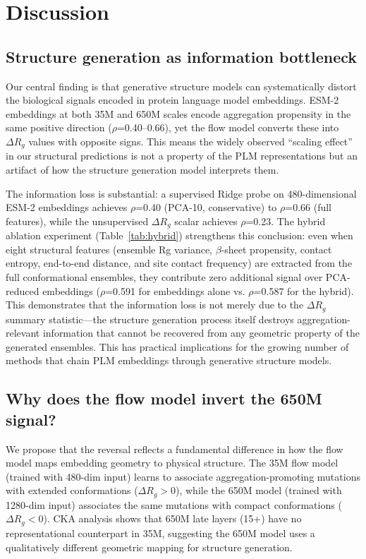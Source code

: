 \documentclass[10pt,letterpaper]{article}
\begin{document}
\section*{Discussion}

\subsection*{Structure generation as information bottleneck}

Our central finding is that generative structure models can systematically distort the biological signals encoded in protein language model embeddings. ESM-2 embeddings at both 35M and 650M scales encode aggregation propensity in the same positive direction ($\rho$=0.40--0.66), yet the flow model converts these into $\Delta R_g$ values with opposite signs. This means the widely observed ``scaling effect'' in our structural predictions is not a property of the PLM representations but an artifact of how the structure generation model interprets them.

The information loss is substantial: a supervised Ridge probe on 480-dimensional ESM-2 embeddings achieves $\rho$=0.40 (PCA-10, conservative) to $\rho$=0.66 (full features), while the unsupervised $\Delta R_g$ scalar achieves $\rho$=0.23. The hybrid ablation experiment (Table~\ref{tab:hybrid}) strengthens this conclusion: even when eight structural features (ensemble Rg variance, $\beta$-sheet propensity, contact entropy, end-to-end distance, and site contact frequency) are extracted from the full conformational ensembles, they contribute zero additional signal over PCA-reduced embeddings ($\rho$=0.591 for embeddings alone vs. $\rho$=0.587 for the hybrid). This demonstrates that the information loss is not merely due to the $\Delta R_g$ summary statistic---the structure generation process itself destroys aggregation-relevant information that cannot be recovered from any geometric property of the generated ensembles. This has practical implications for the growing number of methods that chain PLM embeddings through generative structure models.

\subsection*{Why does the flow model invert the 650M signal?}

We propose that the reversal reflects a fundamental difference in how the flow model maps embedding geometry to physical structure. The 35M flow model (trained with 480-dim input) learns to associate aggregation-promoting mutations with extended conformations ($\Delta R_g > 0$), while the 650M model (trained with 1280-dim input) associates the same mutations with compact conformations ($\Delta R_g < 0$). CKA analysis shows that 650M late layers (15+) have no representational counterpart in 35M, suggesting the 650M model uses a qualitatively different geometric mapping for structure generation.
\end{document}
